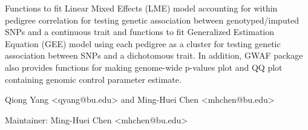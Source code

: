 \begin{Description}\relax
Functions to fit Linear Mixed Effects (LME) model accounting for within pedigree correlation 
for testing genetic association between genotyped/imputed SNPs and a continuous trait and functions to 
fit Generalized Estimation Equation (GEE) model using each pedigree as a cluster for 
testing genetic association between SNPs and a dichotomous trait. In addition, GWAF package 
also provides functions for making genome-wide p-values plot and QQ plot containing genomic control 
parameter estimate.
\end{Description}
\begin{Details}\relax
{}
\end{Details}
\begin{Author}\relax
Qiong Yang <qyang@bu.edu> and Ming-Huei Chen <mhchen@bu.edu>

Maintainer: Ming-Huei Chen <mhchen@bu.edu>
\end{Author}

